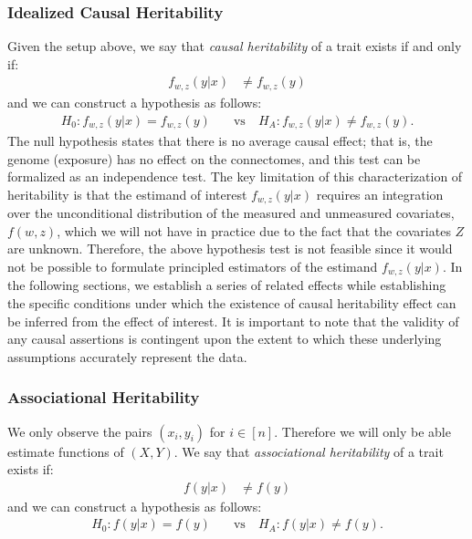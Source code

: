 \subsubsection{Idealized Causal Heritability}
Given the setup above, we say that \textit{causal heritability} of a trait exists if and only if:
\begin{align}
    f_{w, z}(y|x) &\neq f_{w, z}(y)\label{defn:causal_heritability}
\end{align}
and we can construct a hypothesis as follows:
\begin{align}
    H_0: f_{w, z}(y|x) = f_{w, z}(y) \quad &\text{vs} \quad 
    H_A: f_{w, z}(y|x) \neq f_{w, z}(y).
    \label{eq:causal-hypothesis}
\end{align}
The null hypothesis states that there is no average causal effect; that is, the genome (exposure) has no effect on the connectomes, and this test can be formalized as an independence test.
The key limitation of this characterization of heritability is that the estimand of interest $f_{w, z}(y|x)$ requires an integration over the unconditional distribution of the measured and unmeasured covariates, $f(w, z)$, which we will not have in practice due to the fact that the covariates $Z$ are unknown. Therefore, the above hypothesis test is not feasible since it would not be possible to formulate principled estimators of the estimand $f_{w, z}(y|x)$. In the following sections, we establish a series of related effects while establishing the specific conditions under which the existence of causal heritability effect can be inferred from the effect of interest. It is important to note that the validity of any causal assertions is contingent upon the extent to which these underlying assumptions accurately represent the data.

\subsubsection{Associational Heritability} \label{sec:ass-effect}
We only observe the pairs $(x_i, y_i)$ for $i \in [n]$. Therefore we will only be able estimate functions of $(X,Y)$. We say that \textit{associational heritability} of a trait exists if:
\begin{align*} \label{eq:ass}
    f(y|x) &\neq f(y)
\end{align*}
and we can construct a hypothesis as follows:
\begin{align}
    H_0: f(y|x) = f(y) \quad &\text{vs} \quad 
    H_A: f(y|x) \neq f(y).
    \label{eq:ass-hypothesis}
\end{align}

